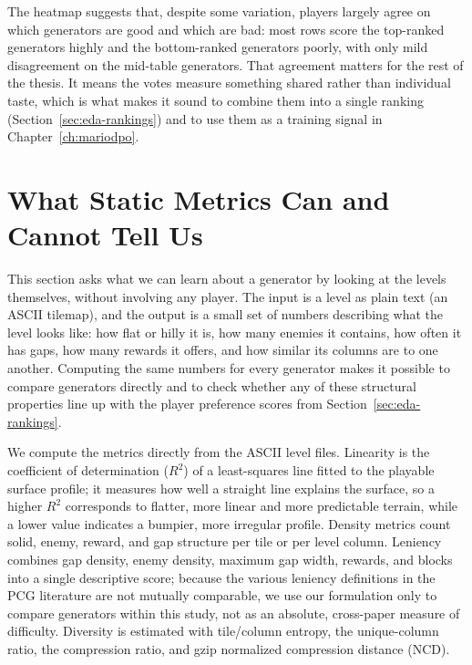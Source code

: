 \documentclass[shortabstract, mgr, english]{iithesis}
\begin{document}
The heatmap suggests that, despite some variation, players largely agree on
which generators are good and which are bad: most rows score the top-ranked
generators highly and the bottom-ranked generators poorly, with only mild
disagreement on the mid-table generators. That agreement matters for the rest
of the thesis. It means the votes measure something shared rather than
individual taste, which is what makes it sound to combine them into a single
ranking (Section~\ref{sec:eda-rankings}) and to use them as a training signal
in Chapter~\ref{ch:mariodpo}.

\section{What Static Metrics Can and Cannot Tell Us}
\label{sec:eda-static-expressive-range}

This section asks what we can learn about a generator by
looking at the levels themselves, without involving any player. The input is a
level as plain text (an ASCII tilemap), and the output is a small set of
numbers describing what the level looks like: how flat or hilly it is, how
many enemies it contains, how often it has gaps, how many rewards it offers,
and how similar its columns are to one another. Computing the same
numbers for every generator makes it possible to compare generators directly
and to check whether any of these structural properties line up with the player
preference scores from Section~\ref{sec:eda-rankings}.

We compute the metrics directly from the ASCII level files. Linearity is the
coefficient of determination ($R^2$) of a least-squares line fitted to the
playable surface profile; it measures how well a straight line explains the
surface, so a higher $R^2$ corresponds to flatter, more linear and more
predictable terrain, while a lower value indicates a bumpier, more irregular
profile. Density metrics count solid,
enemy, reward, and gap structure per tile or per level column. Leniency
combines gap density, enemy density, maximum gap width, rewards, and blocks
into a single descriptive score; because the various leniency definitions in
the PCG literature are not mutually comparable, we use our formulation only to
compare generators within this study, not as an absolute, cross-paper measure
of difficulty. Diversity is estimated with tile/column entropy, the unique-column
ratio, the compression ratio, and gzip normalized compression distance (NCD).
\end{document}

